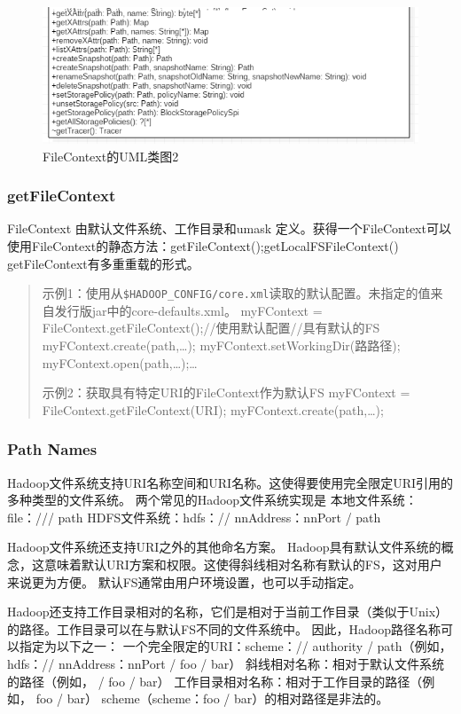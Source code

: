\begin{figure}
\centering
\includegraphics[width=1\linewidth]{UML/abstractfilesystem/FileContext2.PNG}
\caption{FileContext的UML类图2}
\label{fig:FileContext2}
\end{figure}

\subsubsection{getFileContext}
FileContext 由默认文件系统、工作目录和umask 定义。获得一个FileContext可以使用FileContext的静态方法：getFileContext();getLocalFSFileContext()
getFileContext有多重重载的形式。
\begin{quote}
示例1：使用从\verb|$HADOOP_CONFIG/core.xml|读取的默认配置。未指定的值来自发行版jar中的core-defaults.xml。
myFContext = FileContext.getFileContext();//使用默认配置//具有默认的FS
myFContext.create(path,…);
myFContext.setWorkingDir(路路径);
myFContext.open(path,…);…


示例2：获取具有特定URI的FileContext作为默认FS
myFContext = FileContext.getFileContext(URI);
myFContext.create(path,…);
\end{quote}

\subsubsection{Path Names}
Hadoop文件系统支持URI名称空间和URI名称。这使得要使用完全限定URI引用的多种类型的文件系统。
两个常见的Hadoop文件系统实现是
本地文件系统：file：/// path
HDFS文件系统：hdfs：// nnAddress：nnPort / path

Hadoop文件系统还支持URI之外的其他命名方案。
Hadoop具有默认文件系统的概念，这意味着默认URI方案和权限。这使得斜线相对名称有默认的FS，这对用户来说更为方便。
默认FS通常由用户环境设置，也可以手动指定。

Hadoop还支持工作目录相对的名称，它们是相对于当前工作目录（类似于Unix）的路径。工作目录可以在与默认FS不同的文件系统中。
因此，Hadoop路径名称可以指定为以下之一：
一个完全限定的URI：scheme：// authority / path（例如， hdfs：// nnAddress：nnPort / foo / bar）
斜线相对名称：相对于默认文件系统的路径（例如， / foo / bar）
工作目录相对名称：相对于工作目录的路径（例如， foo / bar）
scheme（scheme：foo / bar）的相对路径是非法的。


